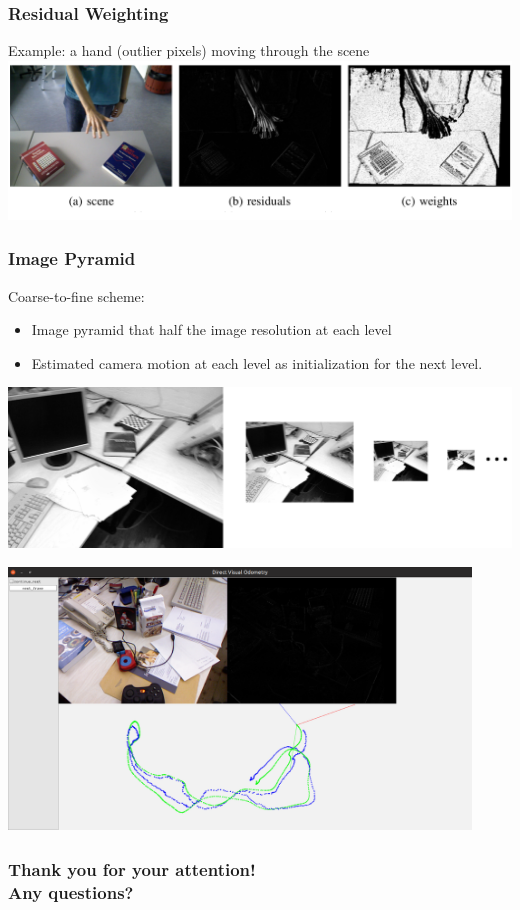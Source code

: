 \begin{frame}
\frametitle{Residual Weighting}

Example: a hand (outlier pixels) moving through the scene \\[\baselineskip]

\includegraphics[width=\textwidth, height=.55\textheight]{Bilder/weighting.png}%

\end{frame}
\clearpage

\begin{frame}
\frametitle{Image Pyramid}

Coarse-to-fine scheme:
\vspace{-1em}
\begin{itemize}
    \item Image pyramid that half the image resolution at each level
    \item Estimated camera motion at each level as initialization for the next level.
\end{itemize}

\includegraphics[width=\textwidth, height=.5\textheight]{Bilder/pyramid.jpg}%

\end{frame}
\clearpage

\begin{frame}
\includegraphics[width=0.92\textwidth]{Bilder/result.png}%

\end{frame}
\clearpage

\begin{frame}
\frametitle{Thank you for your attention! \\ \vspace{2em}Any questions?}

\end{frame}
\clearpage

